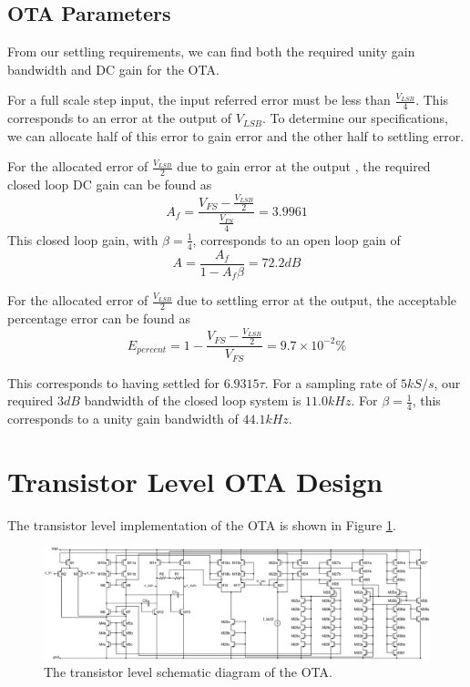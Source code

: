 \documentclass[journal]{IEEEtran}
\begin{document}
\subsection{OTA Parameters}
From our settling requirements, we can find both the required unity gain bandwidth and DC gain for the OTA.

For a full scale step input, the input referred error must be less than $\frac{V_{LSB}}{4}$. This corresponds to an error at the output of $V_{LSB}$. To determine our specifications, we can allocate half of this error to gain error and the other half to settling error.

For the allocated error of $\frac{V_{LSB}}{2}$ due to gain error at the output , the required closed loop DC gain can be found as 
\begin{equation}
A_f = \frac{V_{FS}-\frac{V_{LSB}}{2}}{\frac{V_{FS}}{4}}=3.9961
\end{equation}
This closed loop gain, with $\beta=\frac{1}{4}$, corresponds to an open loop gain of
\begin{equation}
A = \frac{A_f}{1-A_f\beta}=72.2dB
\end{equation}

For the allocated error of $\frac{V_{LSB}}{2}$ due to settling error at the output, the acceptable percentage error can be found as
\begin{equation}
E_{percent}=1-\frac{V_{FS}-\frac{V_{LSB}}{2}}{V_{FS}}=9.7\times 10^{-2}\%
\end{equation}

This corresponds to having settled for $6.9315\tau$. For a sampling rate of $5kS/s$, our required $3dB$ bandwidth of the closed loop system is $11.0kHz$. For $\beta=\frac{1}{4}$, this corresponds to a unity gain bandwidth of $44.1kHz$.

\section{Transistor Level OTA Design}
The transistor level implementation of the OTA is shown in Figure \ref{fig:OTA_schem}.

\begin{figure}
\centering
\includegraphics[width=9in,angle=90]{Schematics/OTA.eps}
\caption{The transistor level schematic diagram of the OTA.}
\label{fig:OTA_schem}
\end{figure}
\end{document}
